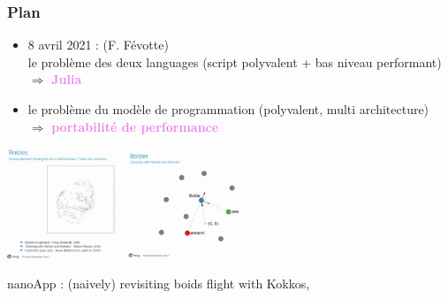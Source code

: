 \begin{frame}
  \frametitle{Plan}

  \begin{itemize}
  \item 8 avril 2021 :  (F. Févotte)\\
     le problème des deux languages (script polyvalent + bas niveau performant)\\ $\Rightarrow$ \textcolor{violet}{\bf Julia}
  \item le problème du modèle de programmation (polyvalent, multi architecture)\\ $\Rightarrow$ \textcolor{violet}{\bf portabilité de performance}
  \end{itemize}

  \begin{center}
    \includegraphics[width=3.5cm]{julia/pourquoi_julia1}
    \includegraphics[width=3.5cm]{julia/pourquoi_julia2}
  \end{center}
  {\small nanoApp : (naively) revisiting boids flight with Kokkos, }

\end{frame}
